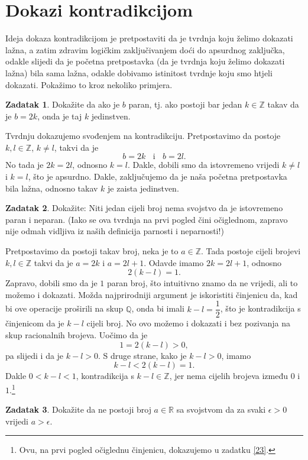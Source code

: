 \documentclass{book}
\renewenvironment{proof}{%
    \vspace{-\parskip}\begin{oldproof}%
    }{%
    \end{oldproof}%
}
\theoremstyle{definition}
\theoremstyle{definition}
\newtheorem{exercise}{Zadatak}
\theoremstyle{remark}
\begin{document}
\section{Dokazi kontradikcijom}
Ideja dokaza kontradikcijom je pretpostaviti da je tvrdnja koju želimo dokazati lažna, a zatim zdravim logičkim zaključivanjem doći do apsurdnog zaključka, odakle slijedi da je početna pretpostavka (da je tvrdnja koju želimo dokazati lažna) bila sama lažna, odakle dobivamo istinitost tvrdnje koju smo htjeli dokazati. Pokažimo to kroz nekoliko primjera.
\begin{exercise}
Dokažite da ako je $b$ paran, tj. ako postoji bar jedan $k\in \mathbb{Z}$ takav da je $b=2k$, onda je taj $k$ jedinstven.
\end{exercise}
\begin{proof}[Rješenje]
Tvrdnju dokazujemo svođenjem na kontradikciju. Pretpostavimo da postoje $k, l\in \mathbb{Z}$, $k\neq l$, takvi da je $$b=2k\;\;\text{ i }\;\;b=2l.$$ No tada je $2k=2l$, odnosno $k=l$. Dakle, dobili smo da istovremeno vrijedi $k\neq l$ i $k=l$, što je apsurdno. Dakle, zaključujemo da je naša početna pretpostavka bila lažna, odnosno takav $k$ je zaista jedinstven.
\end{proof}
\begin{exercise}
Dokažite: Niti jedan cijeli broj nema svojstvo da je istovremeno paran i neparan. (Iako se ova tvrdnja na prvi pogled čini očiglednom, zapravo nije odmah vidljiva iz naših definicija parnosti i neparnosti!)
\end{exercise}
\begin{proof}[Rješenje]
Pretpostavimo da postoji takav broj, neka je to $a\in \mathbb{Z}$. Tada postoje cijeli brojevi $k, l\in \mathbb{Z}$ takvi da je $a=2k$ i $a=2l+1$. Odavde imamo $2k=2l+1$, odnosno 
$$2(k-l)=1.$$
Zapravo, dobili smo da je $1$ paran broj, što intuitivno znamo da ne vrijedi, ali to možemo i dokazati. Možda najprirodniji argument je iskoristiti činjenicu da, kad bi ove operacije proširili na skup $\mathbb{Q}$, onda bi imali $k-l=\dfrac{1}{2}$, što je kontradikcija s činjenicom da je $k-l$ cijeli broj. No ovo možemo i dokazati i bez pozivanja na skup racionalnih brojeva. Uočimo da je $$1=2(k-l)>0,$$ pa slijedi i da je $k-l>0$. S druge strane, kako je $k-l>0$, imamo $$k-l<2(k-l)=1.$$ Dakle $0<k-l<1$, kontradikcija s $k-l\in \mathbb{Z}$, jer nema cijelih brojeva između $0$ i $1$.\footnote{Ovu, na prvi pogled očiglednu činjenicu, dokazujemo u zadatku \ref{23}.}
\end{proof}
\begin{exercise}
Dokažite da ne postoji broj $a\in \mathbb{R}$ sa svojstvom da za svaki $\epsilon>0$ vrijedi $a>\epsilon$.
\end{exercise}
\end{document}

